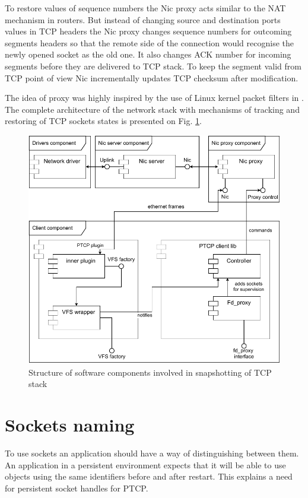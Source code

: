 To restore values of sequence numbers the Nic proxy acts similar to the NAT
mechanism in routers. But instead of changing source and destination ports
values in TCP headers the Nic proxy changes sequence numbers for outcoming
segments headers so that the remote side of the connection would recognise the
newly opened socket as the old one. It also changes ACK number for incoming
segments before they are delivered to TCP stack. To keep the segment valid from
TCP point of view Nic incrementally updates TCP checksum after modification. 

The idea of proxy was highly inspired by the use of Linux kernel packet filters
in \cite{rocks_racks}. The complete architecture of the network stack with
mechanisms of tracking and restoring of TCP sockets states is presented on Fig.
\ref{fig:track_components}.

\begin{figure}
    \centering
    \includegraphics[]{figs/tracking_tcp_stack.pdf}
    \caption{Structure of software components involved in snapshotting of TCP stack}
    \label{fig:track_components}
\end{figure}

\section{Sockets naming}

To use sockets an application should have a way of distinguishing between them.
An application in a persistent environment expects that it will be able to use
objects using the same identifiers before and after restart. This explains a
need for persistent socket handles for PTCP.

